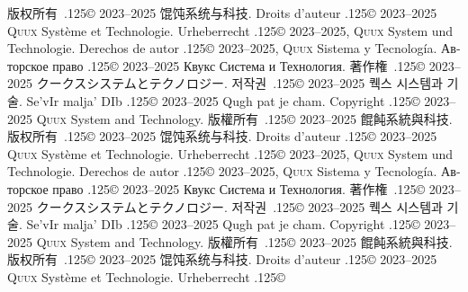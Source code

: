 \documentclass{cookbook}
\begin{document}
{{{版权所有~{\lower.125\baselineskip\hbox{\copyright}}
	2023--2025 馄饨系统与科技.
Droits d'auteur {\lower.125\baselineskip\hbox{\copyright}} %
	2023--2025 \textsc{Quux} Système et Technologie.
Urheberrecht {\lower.125\baselineskip\hbox{\copyright}} %
	2023--2025, \textsc{Quux} System und Technologie.
Derechos de autor {\lower.125\baselineskip\hbox{\copyright}} %
	2023--2025, \textsc{Quux} Sistema y Tecnología.
\foreignlanguage{russian}{Авторское право} %
	{\lower.125\baselineskip\hbox{\copyright}}
	2023–2025 \foreignlanguage{russian}{Квукс Система и Технология.}
著作権~{\lower.125\baselineskip\hbox{\copyright}}
	2023--2025 クークスシステムとテクノロジー.
저작권~{\lower.125\baselineskip\hbox{\copyright}}
	2023--2025 퀙스 시스템과 기술.
Se'vIr malja' DIb {\lower.125\baselineskip\hbox{\copyright}} %
	2023--2025 Qugh pat je cham.
Copyright {\lower.125\baselineskip\hbox{\copyright}}
	2023--2025 \textsc{Quux} System and Technology.
版權所有~{\lower.125\baselineskip\hbox{\copyright}}
	2023--2025 餛飩系統與科技.
版权所有~{\lower.125\baselineskip\hbox{\copyright}}
	2023--2025 馄饨系统与科技.
Droits d'auteur {\lower.125\baselineskip\hbox{\copyright}} %
	2023--2025 \textsc{Quux} Système et Technologie.
Urheberrecht {\lower.125\baselineskip\hbox{\copyright}} %
	2023--2025, \textsc{Quux} System und Technologie.
Derechos de autor {\lower.125\baselineskip\hbox{\copyright}} %
	2023--2025, \textsc{Quux} Sistema y Tecnología.
\foreignlanguage{russian}{Авторское право} %
	{\lower.125\baselineskip\hbox{\copyright}}
	2023–2025 \foreignlanguage{russian}{Квукс Система и Технология.}
著作権~{\lower.125\baselineskip\hbox{\copyright}}
	2023--2025 クークスシステムとテクノロジー.
저작권~{\lower.125\baselineskip\hbox{\copyright}}
	2023--2025 퀙스 시스템과 기술.
Se'vIr malja' DIb {\lower.125\baselineskip\hbox{\copyright}} %
	2023--2025 Qugh pat je cham.
Copyright {\lower.125\baselineskip\hbox{\copyright}}
	2023--2025 \textsc{Quux} System and Technology.
版權所有~{\lower.125\baselineskip\hbox{\copyright}}
	2023--2025 餛飩系統與科技.
版权所有~{\lower.125\baselineskip\hbox{\copyright}}
	2023--2025 馄饨系统与科技.
Droits d'auteur {\lower.125\baselineskip\hbox{\copyright}} %
	2023--2025 \textsc{Quux} Système et Technologie.
Urheberrecht {\lower.125\baselineskip\hbox{\copyright}} %
}}}
\end{document}
